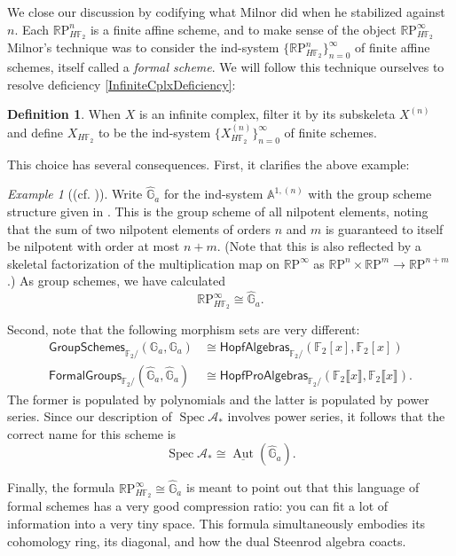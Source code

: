 \documentclass{article}
\newcommand{\F}{\mathbb F}
\newcommand{\G}{\widehat{\mathbb G}}
\newcommand{\R}{\mathbb R}
\newcommand{\RP}{\R\mathrm P}
\newcommand{\<}{\langle}
\renewcommand{\>}{\rangle}
\newcommand{\CatOf}[1]{\mathsf{#1}}
\DeclareMathOperator{\Spec}{Spec}
\DeclareMathOperator{\Aut}{Aut}
\numberwithin{equation}{section}
\theoremstyle{plain}
\theoremstyle{definition}
\newtheorem{definition}[equation]{Definition}
\theoremstyle{remark}
\newtheorem{example}[equation]{Example}
\begin{document}
 We close our discussion by codifying what Milnor did when he stabilized against $n$.  Each $\RP^n_{H\F_2}$ is a finite affine scheme, and to make sense of the object $\RP^\infty_{H\F_2}$ Milnor's technique was to consider the ind-system $\{\RP^n_{H\F_2}\}_{n=0}^\infty$ of finite affine schemes, itself called a \textit{formal scheme}.  We will follow this technique ourselves to resolve deficiency \ref{InfiniteCplxDeficiency}:
\begin{definition}
When $X$ is an infinite complex, filter it by its subskeleta $X^{(n)}$ and define $X_{H\F_2}$ to be the ind-system $\{X^{(n)}_{H\F_2}\}_{n=0}^\infty$ of finite schemes.
\end{definition}
\noindent This choice has several consequences.  First, it clarifies the above example:
\begin{example}[{(cf. )}]\label{RPinftyExampleForReal}
Write $\G_a$ for the ind-system $\mathbb A^{1, (n)}$ with the group scheme structure given in .  This is the group scheme of all nilpotent elements, noting that the sum of two nilpotent elements of orders $n$ and $m$ is guaranteed to itself be nilpotent with order at most $n+m$.  (Note that this is also reflected by a skeletal factorization of the multiplication map on $\RP^\infty$ as $\RP^n \times \RP^m \to \RP^{n+m}$.)  As group schemes, we have calculated \[\RP^\infty_{H\F_2} \cong \G_a.\]
\end{example}
\noindent Second, note that the following morphism sets are very different:
\begin{align*}
\CatOf{GroupSchemes}_{\F_2/}(\mathbb G_a, \mathbb G_a) & \cong \CatOf{HopfAlgebras}_{\F_2/}(\F_2[x], \F_2[x]) \\
\CatOf{FormalGroups}_{\F_2/}(\G_a, \G_a) & \cong \CatOf{HopfProAlgebras}_{\F_2/}(\F_2\llbracket x \rrbracket, \F_2\llbracket x \rrbracket).
\end{align*}
The former is populated by polynomials and the latter is populated by power series.  Since our description of $\Spec \mathcal A_*$ involves power series, it follows that the correct name for this scheme is \[\Spec \mathcal A_* \cong \underline{\Aut}(\G_a).\]

Finally, the formula $\RP^\infty_{H\F_2} \cong \G_a$ is meant to point out that this language of formal schemes has a very good compression ratio: you can fit a lot of information into a very tiny space.  This formula simultaneously embodies its cohomology ring, its diagonal, and how the dual Steenrod algebra coacts.
\end{document}
